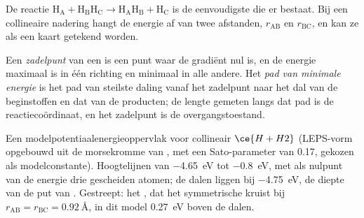De reactie $\mathrm{H_A + H_BH_C \to H_AH_B + H_C}$ is de eenvoudigste die
er bestaat. Bij een collineaire nadering hangt de energie af van twee
afstanden, $r_{\mathrm{AB}}$ en $r_{\mathrm{BC}}$, en kan ze als een kaart
getekend worden.

\begin{definition}\label{def:b3:rate-theories:saddle}
Een \emph{zadelpunt} van een  is
een punt waar de gradiënt nul is, en de energie maximaal is in één
richting en minimaal in alle andere. Het
\emph{pad van minimale energie}
is het pad van steilste daling vanaf het zadelpunt naar het dal van de
beginstoffen en dat van de producten; de lengte gemeten langs dat pad is
de reactiecoördinaat, en het zadelpunt is de overgangstoestand.
\end{definition}

\begin{omfigure}

{\small Een modelpotentiaalenergieoppervlak voor collineair $\ce{H + H2}$
(LEPS-vorm opgebouwd uit de morsekromme van , met een
Sato-parameter van 0.17, gekozen als modelconstante). Hoogtelijnen van
\qty{-4.65}{eV} tot \qty{-0.8}{eV}, met als nulpunt van de energie drie
gescheiden atomen; de dalen liggen bij \qty{-4.75}{eV}, de diepte van de
put van . Gestreept: het , dat het
symmetrische  kruist bij $r_{\mathrm{AB}} = r_{\mathrm{BC}} = \qty{0.92}{\angstrom}$,
in dit model \qty{0.27}{eV} boven de dalen.}
\end{omfigure}

